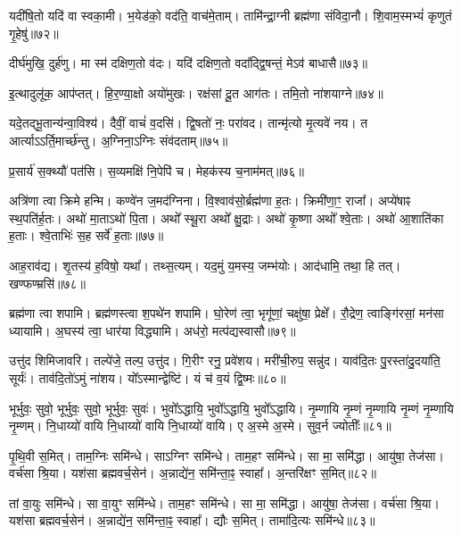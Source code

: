 यदी॑षि॒तो यदि॑ वा स्वका॒मी। 
भ॒येड॑को॒ वद॑ति॒ वाच॑मे॒ताम्। 
तामि॑न्द्रा॒ग्नी ब्रह्म॑णा संविदा॒नौ। 
शि॒वाम॒स्मभ्यं॑ कृणुतं गृ॒हेषु॑॥७२॥
\anuvakamend

दीर्घ॑मुखि॒ दुर्\mbox{}ह॑णु। 
मा स्म॑ दक्षिण॒तो व॑दः। 
यदि॑ दक्षिण॒तो वदा᳚द्द्वि॒षन्तं॒ मेऽव॑ बाधासै॥७३॥
\anuvakamend

इ॒त्थादुलू॑क॒ आप॑प्तत्। 
हि॒र॒ण्या॒क्षो अयो॑मुखः। 
रक्ष॑सां दू॒त आग॑तः। 
तमि॒तो ना॑शयाग्ने॥७४॥
\anuvakamend


यदे॒तद्भू॒तान्य॑न्वा॒विश्य॑। 
दैवीं॒ वाचं॑ व॒दसि॑। 
द्वि॒षतो॑ नः॒ परा॑वद। 
तान्मृ॑त्यो मृ॒त्यवे॑ नय। 
त आर्त्याऽऽर्ति॒मार्च्छ॑न्तु। 
अ॒ग्निना॒ऽग्निः संव॑दताम्॥७५॥
\anuvakamend


प्र॒सार्य॑ स॒क्थ्यौ॑ पत॑सि। 
स॒व्यमक्षि॑ नि॒पेपि॑ च। 
मेहक॑स्य च॒नाम॑मत्॥७६॥
\anuvakamend


अत्रि॑णा त्वा क्रिमे हन्मि। 
कण्वे॑न ज॒मद॑ग्निना। 
वि॒श्वाव॑सो॒र्ब्रह्म॑णा ह॒तः। 
क्रिमी॑णा॒ꣳ॒ राजा᳚। 
अप्ये॑षाꣴ स्थ॒पति॑र्\mbox{}ह॒तः। 
अथो॑ मा॒ताऽथो॑ पि॒ता। 
अथो᳚ स्थू॒रा अथो᳚ क्षु॒द्राः। 
अथो॑ कृ॒ष्णा अथो᳚ श्वे॒ताः। 
अथो॑ आ॒शाति॑का ह॒ताः। 
श्वे॒ताभिः॑ स॒ह सर्वे॑ ह॒ताः॥७७॥
\anuvakamend


आह॒राव॑द्य। 
शृ॒तस्य॑ ह॒विषो॒ यथा᳚। 
तथ्स॒त्यम्। 
यद॒मुं य॒मस्य॒ जम्भ॑योः। 
आद॑धामि॒ तथा॒ हि तत्। 
खण्फण्म्रसि॑॥७८॥
\anuvakamend


ब्रह्म॑णा त्वा शपामि। 
ब्रह्म॑णस्त्वा श॒पथे॑न शपामि। 
घो॒रेण॑ त्वा॒ भृगू॑णां॒ चक्षु॑षा॒ प्रेक्षे᳚। 
रौ॒द्रेण॒ त्वाङ्गि॑रसां॒ मन॑सा ध्यायामि। 
अ॒घस्य॑ त्वा॒ धार॑या विद्ध्यामि। 
अध॑रो॒ मत्प॑द्यस्वासौ॥७९॥%
\anuvakamend


उत्तु॑द शिमिजावरि। 
तल्पे॑जे॒ तल्प॒ उत्तु॑द। 
गि॒रीꣳ रनु॒ प्रवे॑शय। 
मरी॑ची॒रुप॒ सन्नु॑द। 
याव॑दि॒तः पु॒रस्ता॑दु॒दया॑ति॒ सूर्यः॑। 
ताव॑दि॒तो॑ऽमुं ना॑शय। 
यो᳚ऽस्मान्द्वेष्टि॑। 
यं च॑ व॒यं द्वि॒ष्मः॥८०॥%
\anuvakamend


भूर्भुवः॒ सुवो॒ भूर्भुवः॒ सुवो॒ भूर्भुवः॒ सुवः॑। 
भुवो᳚ऽद्धायि॒ भुवो᳚ऽद्धायि॒ भुवो᳚ऽद्धायि। 
नृ॒म्णायि नृ॒म्णं नृ॒म्णायि नृ॒म्णं नृ॒म्णायि नृ॒म्णम्। 
नि॒धाय्यो॑ वायि नि॒धाय्यो॑ वायि नि॒धाय्यो॑ वायि। 
ए अ॒स्मे अ॒स्मे। 
सुव॒र्न ज्योतीः᳚॥८१॥
\anuvakamend


पृ॒थि॒वी स॒मित्। 
ताम॒ग्निः समि॑न्धे। 
साऽग्निꣳ समि॑न्धे। 
ताम॒हꣳ समि॑न्धे। 
सा मा॒ समि॑द्धा। 
आयु॑षा॒ तेज॑सा। 
वर्च॑सा श्रि॒या। 
यश॑सा ब्रह्मवर्च॒सेन॑। 
अ॒न्नाद्ये॑न॒ समि॑न्ता॒ꣴ॒ स्वाहा᳚। 
अ॒न्तरि॑क्षꣳ स॒मित्॥८२॥

तां वा॒युः समि॑न्धे। 
सा वा॒युꣳ समि॑न्धे। 
ताम॒हꣳ समि॑न्धे। 
सा मा॒ समि॑द्धा। 
आयु॑षा॒ तेज॑सा। 
वर्च॑सा श्रि॒या। 
यश॑सा ब्रह्मवर्च॒सेन॑। 
अ॒न्नाद्ये॑न॒ समि॑न्ता॒ꣴ॒ स्वाहा᳚। 
द्यौः स॒मित्। 
तामा॑दि॒त्यः समि॑न्धे॥८३॥

